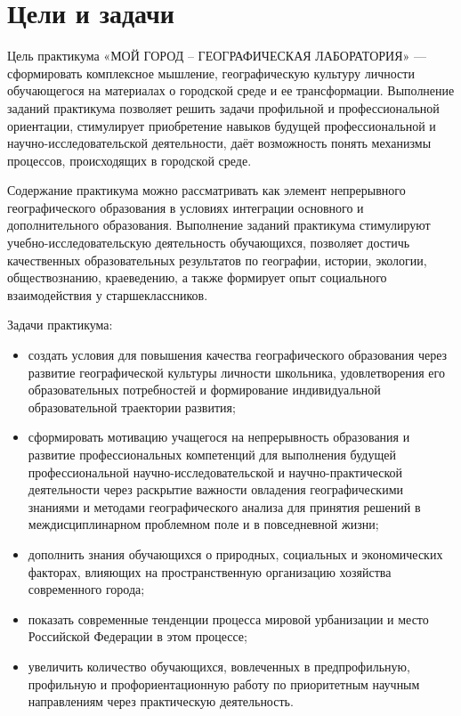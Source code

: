 \documentclass[
  11pt,
]{book}
\begin{document}
\section*{Цели и задачи}\label{ux446ux435ux43bux438-ux438-ux437ux430ux434ux430ux447ux438}

Цель практикума «МОЙ ГОРОД -- ГЕОГРАФИЧЕСКАЯ ЛАБОРАТОРИЯ» --- сформировать комплексное мышление, географическую культуру личности обучающегося на материалах о городской среде и ее трансформации. Выполнение заданий практикума позволяет решить задачи профильной и профессиональной ориентации, стимулирует приобретение навыков будущей профессиональной и научно-исследовательской деятельности, даёт возможность понять механизмы процессов, происходящих в городской среде.

Содержание практикума можно рассматривать как элемент непрерывного географического образования в условиях интеграции основного и дополнительного образования. Выполнение заданий практикума стимулируют учебно-исследовательскую деятельность обучающихся, позволяет достичь качественных образовательных результатов по географии, истории, экологии, обществознанию, краеведению, а также формирует опыт социального взаимодействия у старшеклассников.

Задачи практикума:

\begin{itemize}
\item
  создать условия для повышения качества географического образования через развитие географической культуры личности школьника, удовлетворения его образовательных потребностей и формирование индивидуальной образовательной траектории развития;
\item
  сформировать мотивацию учащегося на непрерывность образования и развитие профессиональных компетенций для выполнения будущей профессиональной научно-исследовательской и научно-практической деятельности через раскрытие важности овладения географическими знаниями и методами географического анализа для принятия решений в междисциплинарном проблемном поле и в повседневной жизни;
\item
  дополнить знания обучающихся о природных, социальных и экономических факторах, влияющих на пространственную организацию хозяйства современного города;
\item
  показать современные тенденции процесса мировой урбанизации и место Российской Федерации в этом процессе;
\item
  увеличить количество обучающихся, вовлеченных в предпрофильную, профильную и профориентационную работу по приоритетным научным направлениям через практическую деятельность.
\end{itemize}
\end{document}

